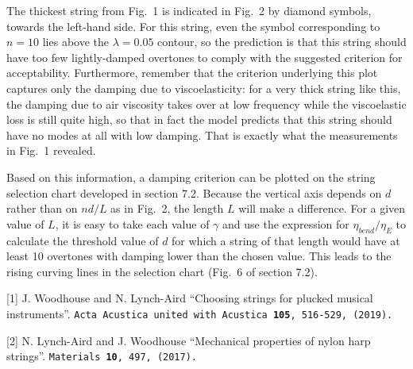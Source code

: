   The thickest string from Fig.\ 1 is indicated in Fig.\ 2 by diamond symbols, 
  towards the left-hand side. For this string, even the symbol corresponding to 
  $n=10$ lies above the $\lambda=0.05$ contour, so the prediction is that this 
  string should have too few lightly-damped overtones to comply with the 
  suggested criterion for acceptability. Furthermore, remember that the 
  criterion underlying this plot captures only the damping due to 
  viscoelasticity: for a very thick string like this, the damping due to air 
  viscosity takes over at low frequency while the viscoelastic loss is still 
  quite high, so that in fact the model predicts that this string should have 
  no modes at all with low damping. That is exactly what the measurements in 
  Fig.\ 1 revealed. 

  Based on this information, a damping criterion can be plotted on the string 
  selection chart developed in section 7.2. Because the vertical axis depends 
  on $d$ rather than on $nd/L$ as in Fig.\ 2, the length $L$ will make a 
  difference. For a given value of $L$, it is easy to take each value of 
  $\gamma$ and use the expression for $\eta_{bend}/\eta_E$ to calculate the 
  threshold value of $d$ for which a string of that length would have at least 
  10 overtones with damping lower than the chosen value. This leads to the 
  rising curving lines in the selection chart (Fig.\ 6 of section 7.2). 

  \sectionreferences{}[1] J. Woodhouse and N. Lynch-Aird ``Choosing strings for 
  plucked musical instruments''. \tt{}Acta Acustica united with Acustica 
  \textbf{105}, 516-529, (2019)\rm{}.~ 

  [2] N. Lynch-Aird and J. Woodhouse ``Mechanical properties of nylon harp 
  strings''. \tt{}Materials \textbf{10}, 497, (2017)\rm{}.~ 